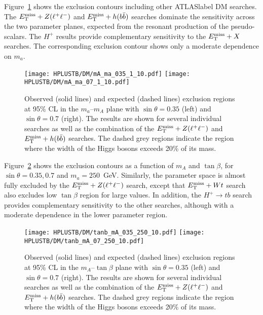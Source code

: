 Figure~\ref{Hplustb:2HDMa_mA_ma} shows the exclusion contours including other \acrshort{ATLASlabel} DM searches. The $E_{\text{T}}^{\text{miss}}+ Z(\ell^+\ell^-)$ and $E_{\text{T}}^{\text{miss}}+ h(b\bar{b})$ searches dominate the sensitivity across the two parameter planes, expected from the resonant production of the pseudo-scalars. The $H^+$ results provide complementary sensitivity to the $E_{\text{T}}^{\text{miss}}+ X$ searches. The corresponding exclusion contour shows only a moderate dependence on $m_a$.

\begin{figure}[htb]
    \RawFloats
    \centering
    \texttt{[image: HPLUSTB/DM/mA\_ma\_035\_1\_10.pdf]}
    \texttt{[image: HPLUSTB/DM/mA\_ma\_07\_1\_10.pdf]}
    \caption{Observed (solid lines) and expected (dashed lines) exclusion regions at 95\% CL in the $m_a$--$m_A$ plane with $\sin\theta=0.35$ (left) and $\sin\theta=0.7$ (right). The results are shown for several individual searches as well as the combination of the $E_{\text{T}}^{\text{miss}}+Z(\ell^+\ell^-)$ and $E_{\text{T}}^{\text{miss}}+h(b\bar{b})$ searches. The dashed grey regions indicate the region where the width of the Higgs bosons exceeds 20\% of its mass.}
    \label{Hplustb:2HDMa_mA_ma}
\end{figure}

Figure~\ref{Hplustb:2HDMa_tanb_mA} shows the exclusion contours as a function of $m_A$ and $\tan\beta$, for $\sin\theta=0.35,0.7$ and $m_a=250$~GeV. Similarly, the parameter space is almost fully excluded by the $E_{\text{T}}^{\text{miss}}+ Z(\ell^+\ell^-)$ search, except that $E_{\text{T}}^{\text{miss}}+ Wt$ search also excludes low $\tan\beta$ region for large values. In addition, the $H^+\to tb$ search provides complementary sensitivity to the other searches, although with a moderate dependence in the lower parameter region.

\begin{figure}[htb]
    \RawFloats
    \centering
    \texttt{[image: HPLUSTB/DM/tanb\_mA\_035\_250\_10.pdf]}
    \texttt{[image: HPLUSTB/DM/tanb\_mA\_07\_250\_10.pdf]}
    \caption{Observed (solid lines) and expected (dashed lines) exclusion regions at 95\% CL in the $m_A$--$\tan\beta$ plane with $\sin\theta=0.35$ (left) and $\sin\theta=0.7$ (right). The results are shown for several individual searches as well as the combination of the $E_{\text{T}}^{\text{miss}}+Z(\ell^+\ell^-)$ and $E_{\text{T}}^{\text{miss}}+h(b\bar{b})$ searches. The dashed grey regions indicate the region where the width of the Higgs bosons exceeds 20\% of its mass.}
    \label{Hplustb:2HDMa_tanb_mA}
\end{figure}

